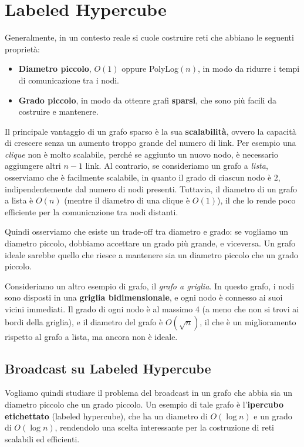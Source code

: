 \chapter{Labeled Hypercube}

Generalmente, in un contesto reale si cuole costruire reti che abbiano le seguenti proprietà:
\begin{itemize}
    \item \textbf{Diametro piccolo}, $O(1)$ oppure PolyLog$(n)$, in modo da ridurre i tempi di comunicazione tra i nodi.
    \item \textbf{Grado piccolo}, in modo da ottenre grafi \textbf{sparsi}, che sono più facili da costruire e mantenere.
\end{itemize}

Il principale vantaggio di un grafo sparso è la sua \textbf{scalabilità}, ovvero la capacità di crescere senza un aumento troppo grande del numero di link. Per esempio una \textit{clique} non è molto scalabile, perché se aggiunto un nuovo nodo, è necessario aggiungere altri $n-1$ link. Al contrario, se consideriamo un grafo a \textit{lista}, osserviamo che è facilmente scalabile, in quanto il grado di ciascun nodo è $2$, indipendentemente dal numero di nodi presenti. Tuttavia, il diametro di un grafo a lista è $O(n)$ (mentre il diametro di una clique è $O(1)$), il che lo rende poco efficiente per la comunicazione tra nodi distanti.

Quindi osserviamo che esiste un trade-off tra diametro e grado: se vogliamo un diametro piccolo, dobbiamo accettare un grado più grande, e viceversa. Un grafo ideale sarebbe quello che riesce a mantenere sia un diametro piccolo che un grado piccolo.

Consideriamo un altro esempio di grafo, il \textit{grafo a griglia}. In questo grafo, i nodi sono disposti in una \textbf{griglia bidimensionale}, e ogni nodo è connesso ai suoi vicini immediati. Il grado di ogni nodo è al massimo 4 (a meno che non si trovi ai bordi della griglia), e il diametro del grafo è $O(\sqrt{n})$, il che è un miglioramento rispetto al grafo a lista, ma ancora non è ideale.

\section{Broadcast su Labeled Hypercube}

Vogliamo quindi studiare il problema del broadcast in un grafo che abbia sia un diametro piccolo che un grado piccolo. Un esempio di tale grafo è l'\textbf{ipercubo etichettato} (labeled hypercube), che ha un diametro di $O(\log n)$ e un grado di $O(\log n)$, rendendolo una scelta interessante per la costruzione di reti scalabili ed efficienti.

